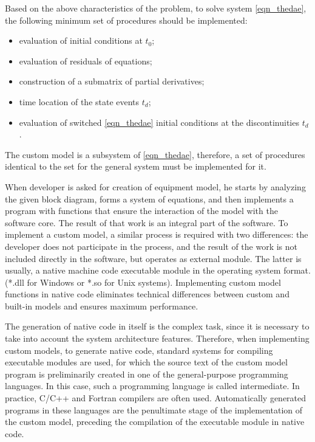 \documentclass[lettersize,journal]{IEEEtran}
\begin{document}
Based on the above characteristics of the problem, to solve system \eqref{eqn_thedae}, the following minimum set of procedures should be implemented:
\begin{itemize}
	\item evaluation of initial conditions at \(t_0\);
	\item evaluation of residuals of equations;
	\item construction of a submatrix of partial derivatives;
	\item time location of the state events \(t_d\);
	\item evaluation of switched \eqref{eqn_thedae} initial conditions at the discontinuities \(t_d\).
\end{itemize}

The custom model is a subsystem of \eqref{eqn_thedae}, therefore, a set of procedures identical to the set for the general system must be implemented for it.

When developer is asked for creation of equipment model, he starts by analyzing the given block diagram, forms a system of equations, and then implements 
a program with functions that ensure the interaction of the model with the software core. The result of that work is an integral part of the software. 
To implement a custom model, a similar process is required with two differences: the developer does not participate in the process, and the result of the work 
is not included directly in the software, but operates as external module. The latter is usually, a native machine code executable module in the operating system format.
(*.dll for Windows or *.so for Unix systems). Implementing custom model functions in native code eliminates technical differences between custom and 
built-in models and ensures maximum performance.

The generation of native code in itself is the complex task, since it is necessary to take into account the system architecture features.
Therefore, when implementing custom models, to generate native code, standard systems for compiling executable modules are used, 
for which the source text of the custom model program is preliminarily created in one of the general-purpose programming languages. 
In this case, such a programming language is called intermediate. In practice, C/C++ and Fortran compilers are often used. 
Automatically generated programs in these languages are the penultimate stage of the implementation of the custom model, 
preceding the compilation of the executable module in native code.
\end{document}
